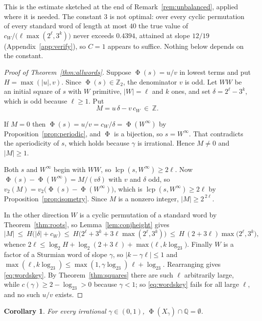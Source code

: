 \documentclass[11pt,reqno]{amsart}
\theoremstyle{plain}
\newtheorem{corollary}[theorem]{Corollary}
\theoremstyle{definition}
\newcommand{\Zt}{\mathbb{Z}_2}
\newcommand{\Z}{\mathbb{Z}}
\newcommand{\Q}{\mathbb{Q}}
\newcommand{\vt}{v_2}
\newcommand{\lcp}{\operatorname{lcp}}
\DeclareMathOperator{\Ph}{\Phi}
\begin{document}
This is the estimate sketched at the end of Remark~\ref{rem:unbalanced}, applied
where it is needed. The constant $3$ is not optimal: over every cyclic
permutation of every standard word of length at most $40$ the true value of
$c_W/\bigl(\ell\max(2^{\ell},3^{k})\bigr)$ never exceeds $0.4394$, attained at
slope $12/19$ (Appendix~\ref{app:verify}), so $C=1$ appears to suffice. Nothing
below depends on the constant.

\begin{proof}[Proof of Theorem~\ref{thm:allwords}]
Suppose $\Ph(s)=u/v$ in lowest terms and put $H=\max(|u|,v)$. Since
$\Ph(s)\in\Zt$, the denominator $v$ is odd. Let $WW$ be an initial square of $s$
with $W$ primitive, $|W|=\ell$ and $k$ ones, and set $\delta=2^{\ell}-3^{k}$,
which is odd because $\ell\ge1$. Put
\[
M=u\,\delta-v\,c_W\ \in\ \Z .
\]

If $M=0$ then $\Ph(s)=u/v=c_W/\delta=\Ph(W^{\infty})$ by
Proposition~\ref{prop:periodic}, and $\Ph$ is a bijection, so $s=W^{\infty}$.
That contradicts the aperiodicity of $s$, which holds because $\gamma$ is
irrational. Hence $M\ne0$ and $|M|\ge1$.

Both $s$ and $W^{\infty}$ begin with $WW$, so $\lcp(s,W^{\infty})\ge2\ell$. Now
$\Ph(s)-\Ph(W^{\infty})=M/(v\delta)$ with $v$ and $\delta$ odd, so
$\vt(M)=\vt\bigl(\Ph(s)-\Ph(W^{\infty})\bigr)$, which is
$\lcp(s,W^{\infty})\ge2\ell$ by Proposition~\ref{prop:isometry}. Since $M$ is a
nonzero integer, $|M|\ge2^{\,2\ell}$.

In the other direction $W$ is a cyclic permutation of a standard word by
Theorem~\ref{thm:roots}, so Lemma~\ref{lem:conjheight} gives
\[
|M|\ \le\ H\bigl(|\delta|+c_W\bigr)\ \le\ H\bigl(2^{\ell}+3^{k}+3\ell\max(2^{\ell},3^{k})\bigr)
\ \le\ H\,(2+3\ell)\max\bigl(2^{\ell},3^{k}\bigr),
\]
whence $2\ell\le\log_2H+\log_2(2+3\ell)+\max\bigl(\ell,k\log_23\bigr)$. Finally
$W$ is a factor of a Sturmian word of slope $\gamma$, so $|k-\gamma\ell|\le1$ and
$\max(\ell,k\log_23)\le\max(1,\gamma\log_23)\,\ell+\log_23$. Rearranging gives
\eqref{eq:wordskey}. By Theorem~\ref{thm:squares} there are such $\ell$
arbitrarily large, while $c(\gamma)\ge2-\log_23>0$ because $\gamma<1$; so
\eqref{eq:wordskey} fails for all large $\ell$, and no such $u/v$ exists.
\end{proof}

\begin{corollary}\label{cor:subshift}
For every irrational $\gamma\in(0,1)$, $\Ph(X_\gamma)\cap\Q=\emptyset$.
\end{corollary}
\end{document}
